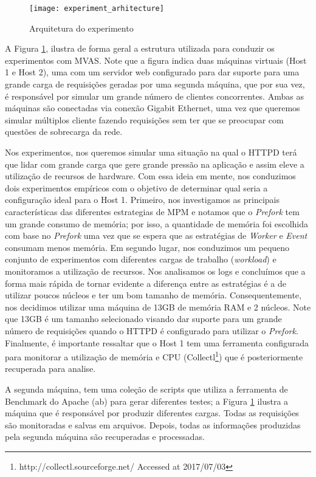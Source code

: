 \begin{figure}[!h] \centering
\texttt{[image: experiment\_arhitecture]}
\caption{Arquitetura do experimento} \label{fig:experiment_architecture}
\end{figure}

A Figura  \ref{fig:experiment_architecture}, ilustra de forma geral a estrutura
utilizada para conduzir os experimentos com MVAS. Note que a figura indica duas
máquinas virtuais (Host 1 e Host 2), uma com um servidor web configurado para
dar suporte para uma grande carga de requisições geradas por uma segunda
máquina, que por sua vez, é responsável por simular um grande número de
clientes concorrentes. Ambas as máquinas são conectadas via conexão Gigabit
Ethernet, uma vez que queremos simular múltiplos cliente fazendo requisições
sem ter que se preocupar com questões de sobrecarga da rede.

Nos experimentos, nos queremos simular uma situação na qual o HTTPD terá que
lidar com grande carga que gere grande pressão na aplicação e assim eleve a
utilização de recursos de hardware. Com essa ideia em mente, nos conduzimos
dois experimentos empíricos com o objetivo de determinar qual seria a
configuração ideal para o Host 1. Primeiro, nos investigamos as principais
características das diferentes estrategias de MPM e notamos que o
\emph{Prefork} tem um grande consumo de memória; por isso, a quantidade de
memória foi escolhida com base no \emph{Prefork} uma vez que se espera que as
estratégias de \emph{Worker} e \emph{Event} consumam menos memória. Em segundo
lugar, nos conduzimos um pequeno conjunto de experimentos com diferentes cargas
de trabalho (\emph{workload}) e monitoramos a utilização de recursos. Nos
analisamos os logs e concluímos que a forma mais rápida de tornar evidente a
diferença entre as estratégias é a de utilizar poucos núcleos e ter um bom
tamanho de memória. Consequentemente, nos decidimos utilizar uma máquina de
13GB de memória RAM e 2 núcleos. Note que 13GB é um tamanho selecionado visando
dar suporte para um grande número de requisições quando o HTTPD é configurado
para utilizar o \emph{Prefork}. Finalmente, é importante ressaltar que o Host 1
tem uma ferramenta configurada para monitorar a utilização de memória e CPU
(Collectl\footnote{http://collectl.sourceforge.net/ Accessed at 2017/07/03})
que é posteriormente recuperada para analise.

A segunda máquina, tem uma coleção de scripts que utiliza a ferramenta de
Benchmark do Apache (ab) para gerar diferentes testes; a Figura
\ref{fig:experiment_architecture} ilustra a máquina que é responsável por
produzir diferentes cargas. Todas as requisições são monitoradas e salvas em
arquivos. Depois, todas as informações produzidas pela segunda máquina são
recuperadas e processadas.

